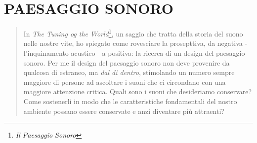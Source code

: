 
\chapter{PAESAGGIO SONORO}


\begin{quote}
  In \emph{The Tuning og the World}\footnote{\emph{Il Paesaggio Sonoro}}, un saggio
  che tratta della storia del suono nelle nostre vite, ho spiegato come rovesciare
  la prosepttiva, da negativa - l'inquinamento acustico - a positiva: la ricerca di
  un design del paesaggio sonoro. Per me il design del paesaggio sonoro non deve
  provenire da qualcosa di estraneo, ma \emph{dal di dentro}, stimolando un numero
  sempre maggiore di persone ad ascoltare i suoni che ci circondano con una
  maggiore attenzione critica. Quali sono i suoni che desideriamo conservare?
  Come sostenerli in modo che le caratteristiche fondamentali del nostro ambiente
  possano essere conservate e anzi diventare più attraenti?
\end{quote}
